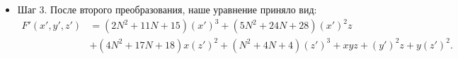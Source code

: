 \documentclass[a4paper,12pt]{article}
\theoremstyle{definition}
\begin{document}
\begin{itemize}[leftmargin=1cm]
        \item Шаг 3. После второго преобразования, наше уравнение приняло вид:
        \begin{align*}
            F'(x', y', z') &= \left(2 N^2 + 11 N + 15\right) \left( x' \right)^3
            + \left(5 N^2 + 24 N + 28\right) \left( x' \right)^2 z \\ &+ \left(4 N^2
            + 17 N + 18\right) x \left( z' \right)^2 + \left(N^2 + 4 N +
            4\right) \left( z' \right)^3  + x y z + \left( y' \right)^2 z + y
            \left( z' \right)^2 
        .\end{align*}

        
    \end{itemize}
\end{document}
